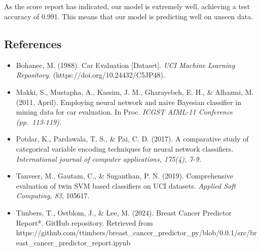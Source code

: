 \documentclass[
  letterpaper,
  DIV=11,
  numbers=noendperiod]{scrartcl}
\begin{document}
\subsection{}\label{section}

As the score report has indicated, our model is extremely well,
achieving a test accuracy of 0.991. This means that our model is
predicting well on unseen data.

\subsection{References}\label{references}

\begin{itemize}
\item
  Bohanec, M. (1988). Car Evaluation {[}Dataset{]}. \emph{UCI Machine
  Learning Repository.} (https://doi.org/10.24432/C5JP48).
\item
  Makki, S., Mustapha, A., Kassim, J. M., Gharayebeh, E. H., \& Alhazmi,
  M. (2011, April). Employing neural network and naive Bayesian
  classifier in mining data for car evaluation. In Proc. \emph{ICGST
  AIML-11 Conference (pp.~113-119).}
\item
  Potdar, K., Pardawala, T. S., \& Pai, C. D. (2017). A comparative
  study of categorical variable encoding techniques for neural network
  classifiers. \emph{International journal of computer applications,
  175(4), 7-9.}
\item
  Tanveer, M., Gautam, C., \& Suganthan, P. N. (2019). Comprehensive
  evaluation of twin SVM based classifiers on UCI datasets.
  \emph{Applied Soft Computing, 83}, 105617.
\item
  Timbers, T., Ostblom, J., \& Lee, M. (2024). Breast Cancer Predictor
  Report*. GitHub repository. Retrieved from
  https://github.com/ttimbers/breast\_cancer\_predictor\_py/blob/0.0.1/src/breast\_cancer\_predictor\_report.ipynb
\end{itemize}
\end{document}
